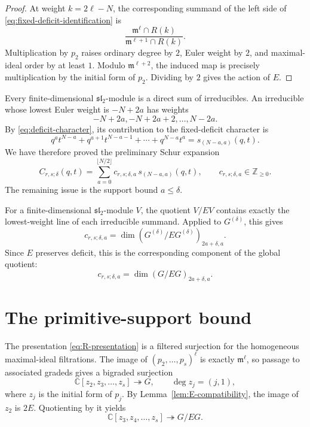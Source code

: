 \documentclass[11pt]{article}
\newcommand{\C}{\mathbb{C}}
\newcommand{\Z}{\mathbb{Z}}
\begin{document}
\begin{proof}
At weight $k=2\ell-N$, the corresponding summand of the left side of
\eqref{eq:fixed-deficit-identification} is
\[
 \frac{\mathfrak m^\ell\cap R(k)}
      {\mathfrak m^{\ell+1}\cap R(k)}.
\]
Multiplication by $p_2$ raises ordinary degree by $2$, Euler weight by
$2$, and maximal-ideal order by at least $1$.  Modulo
$\mathfrak m^{\ell+2}$, the induced map is precisely multiplication by
the initial form of $p_2$.  Dividing by $2$ gives the action of $E$.
\end{proof}

Every finite-dimensional $\mathfrak{sl}_2$-module is a direct sum of
irreducibles.  An irreducible whose lowest Euler weight is
$-N+2a$ has weights
\[
 -N+2a,-N+2a+2,\ldots,N-2a.
\]
By \eqref{eq:deficit-character}, its contribution to the fixed-deficit
character is
\[
 q^at^{N-a}+q^{a+1}t^{N-a-1}+\cdots+q^{N-a}t^a
 =s_{(N-a,a)}(q,t).
\]
We have therefore proved the preliminary Schur expansion
\begin{equation}\label{eq:preliminary-Schur}
 C_{r,s;\delta}(q,t)
 =\sum_{a=0}^{\lfloor N/2\rfloor}
 c_{r,s;\delta,a}\,s_{(N-a,a)}(q,t),
 \qquad c_{r,s;\delta,a}\in\Z_{\geq0}.
\end{equation}
The remaining issue is the support bound $a\leq\delta$.

For a finite-dimensional $\mathfrak{sl}_2$-module $V$, the quotient
$V/EV$ contains exactly the lowest-weight line of each irreducible
summand.  Applied to $G^{(\delta)}$, this gives
\begin{equation}\label{eq:primitive-G-delta}
 c_{r,s;\delta,a}
 =\dim\left(G^{(\delta)}/EG^{(\delta)}\right)_{2a+\delta,a}.
\end{equation}
Since $E$ preserves deficit, this is the corresponding component of
the global quotient:
\begin{equation}\label{eq:primitive-global}
 c_{r,s;\delta,a}
 =\dim(G/EG)_{2a+\delta,a}.
\end{equation}

\section{The primitive-support bound}\label{sec:support}

The presentation \eqref{eq:R-presentation} is a filtered surjection
for the homogeneous maximal-ideal filtrations.  The image of
$(p_2,\ldots,p_s)^\ell$ is exactly $\mathfrak m^\ell$, so passage to
associated gradeds gives a bigraded surjection
\begin{equation}\label{eq:polynomial-to-G}
 \C[z_2,z_3,\ldots,z_s]\twoheadrightarrow G,
 \qquad \deg z_j=(j,1),
\end{equation}
where $z_j$ is the initial form of $p_j$.  By
Lemma~\ref{lem:E-compatibility}, the image of $z_2$ is $2E$.
Quotienting by it yields
\begin{equation}\label{eq:polynomial-to-primitive}
 \C[z_3,z_4,\ldots,z_s]\twoheadrightarrow G/EG.
\end{equation}
\end{document}
